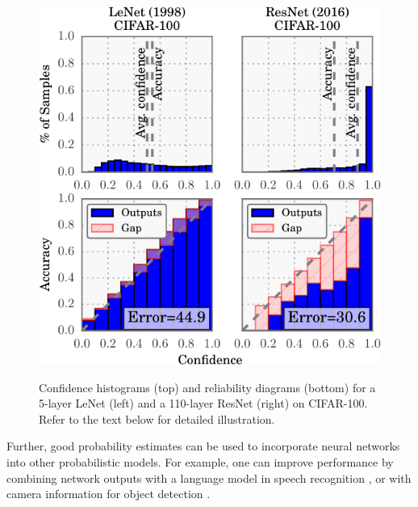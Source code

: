 \begin{figure}[t!]
  \centering
  \includegraphics[width=0.8\columnwidth]{figures/confidence.pdf}
  \includegraphics[width=0.8\columnwidth]{figures/comparison_with_caruana.pdf}
  \caption{Confidence histograms (top) and reliability diagrams (bottom) for a 5-layer LeNet (left) and a 110-layer ResNet (right) on CIFAR-100. Refer to the text below for detailed illustration.}
  \label{figure.complenet}
  \vspace{8pt}
\end{figure}

Further, good probability estimates can be used to incorporate neural networks into other probabilistic models.
For example, one can improve performance by combining network outputs with a language model in speech recognition \cite{hannun2014deep,xiong2016achieving}, or with camera information for object detection \citep{kendall2015modelling}.

